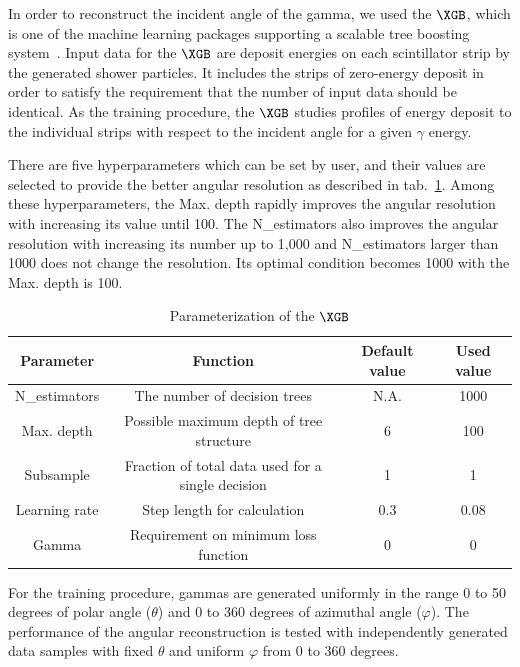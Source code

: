 In order to reconstruct the incident angle of the gamma, we used the $\XGB$, which is one of the machine learning packages supporting a scalable tree boosting system~\cite{xgboost:2016}. Input data for the $\XGB$ are deposit energies on each scintillator strip by the generated shower particles. It includes the strips of zero-energy deposit in order to satisfy the requirement that the number of input data should be identical. As the training procedure, the $\XGB$ studies profiles of energy deposit to the individual strips with respect to the incident angle for a given $\gamma$ energy. 

There are five hyperparameters which can be set by user, and their values are selected to provide the better angular resolution as described in tab.~\ref{tab:XgbPar}. Among these hyperparameters, the Max. depth rapidly improves the angular resolution with increasing its value until 100. The N\_estimators also improves the angular resolution with increasing its number up to 1,000 and N\_estimators larger than 1000 does not change the resolution. Its optimal condition becomes 1000 with the Max. depth is 100.

\begin{table}[hbt!]
\centering
\caption{Parameterization of the $\XGB$}
\begin{tabular}{cccc}
\hline 
Parameter & Function & Default value & Used value \\ \hline 
N\_estimators & The number of decision trees & N.A. & 1000 \\  
Max. depth & Possible maximum depth of tree structure & 6 & 100 \\ 
Subsample & Fraction of total data used for a single decision & 1 & 1 \\ 
Learning rate & Step length for calculation & 0.3 & 0.08 \\ 
Gamma & Requirement on minimum loss function & 0 & 0 \\ 
\hline
\end{tabular}
\label{tab:XgbPar}
\end{table}

For the training procedure, gammas are generated uniformly in the range 0 to 50 degrees of polar angle ($\theta$) and  0 to 360 degrees of azimuthal angle ($\varphi$). The performance of the angular reconstruction is tested with independently generated data samples with fixed $\theta$ and uniform $\varphi$ from 0 to 360 degrees.

